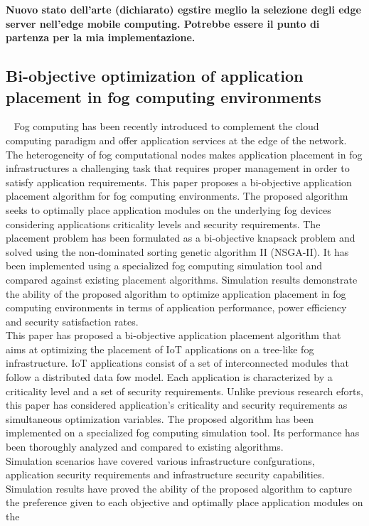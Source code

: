 \textbf{Nuovo stato dell'arte (dichiarato) egstire meglio la selezione degli edge server nell'edge mobile computing. 
Potrebbe essere il punto di partenza per la mia implementazione.}


\subsection{Bi-objective optimization of application placement in fog computing environments}~\cite{al2022bi}
Fog computing has been recently introduced to complement the cloud computing paradigm and offer application services at the edge of the network. 
The heterogeneity of fog computational nodes makes application placement in fog infrastructures a challenging task that requires proper management in order to 
satisfy application requirements. This paper proposes a bi-objective application placement algorithm for fog computing environments. 
The proposed algorithm seeks to optimally place application modules on the underlying fog devices considering applications criticality levels and security requirements. 
The placement problem has been formulated as a bi-objective knapsack problem and solved using the non-dominated sorting genetic algorithm II (NSGA-II). 
It has been implemented using a specialized fog computing simulation tool and compared against existing placement algorithms. 
Simulation results demonstrate the ability of the proposed algorithm to optimize application placement in fog computing environments in terms of application performance, 
power efficiency and security satisfaction rates.\\
This paper has proposed a bi-objective application placement algorithm that aims at optimizing the placement of IoT
applications on a tree-like fog infrastructure. IoT applications consist of a set of interconnected modules that follow
a distributed data fow model. Each application is characterized by a criticality level and a set of security requirements.
Unlike previous research eforts, this paper has considered application’s criticality and security requirements as simultaneous optimization variables. 
The proposed algorithm has been implemented on a specialized fog computing simulation tool. 
Its performance has been thoroughly analyzed and compared to existing algorithms. \\
Simulation scenarios have covered various infrastructure confgurations, application security requirements and infrastructure security capabilities. 
Simulation results have proved the ability of the proposed algorithm to capture the preference given to each objective and optimally place application modules on the
